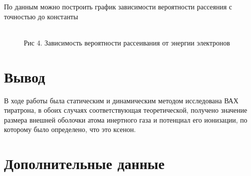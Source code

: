 \documentclass[12pt]{article}
\begin{document}
      По данным можно построить график зависимости вероятности рассеяния с
      точностью до константы \\

      \begin{figure}[h!]
        \\
        Рис 4. Зависимость вероятности рассеивания от энергии электронов
        \label{fig:oscillograme}
      \end{figure}

    \section{Вывод}
      В ходе работы была статическим и динамическим методом исследована ВАХ
      тиратрона, в обоих случаях соответствующая теоретической, получено
      значение размера внешней оболочки атома инертного газа и потенциал его
      ионизации, по которому было определено, что это ксенон.

    \newpage
    \section{Дополнительные данные}
\end{document}
